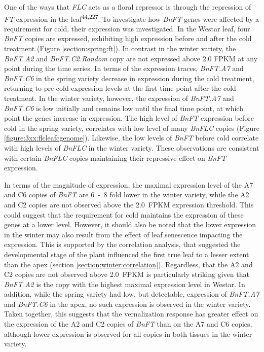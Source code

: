 \documentclass[12pt,]{book}
\begin{document}
One of the ways that \emph{FLC} acts as a floral repressor is through
the repression of \emph{FT} expression in the
leaf\textsuperscript{44,227}. To investigate how \emph{BnFT} genes were
affected by a requirement for cold, their expression was investigated.
In the Westar leaf, four \emph{BnFT} copies are expressed, exhibiting
high expression before and after the cold treatment (Figure
\ref{section:spring:ft}). In contrast in the winter variety, the
\emph{BnFT.A2} and \emph{BnFT.C2.Random} copy are not expressed above
2.0 FPKM at any point during the time series. In terms of the expression
traces, \emph{BnFT.A7} and \emph{BnFT.C6} in the spring variety decrease
in expression during the cold treatment, returning to pre-cold
expression levels at the first time point after the cold treatment. In
the winter variety, however, the expression of \emph{BnFT.A7} and
\emph{BnFT.C6} is low initially and remains low until the final time
point, at which point the genes increase in expression. The high level
of \emph{BnFT} expression before cold in the spring variety, correlates
with low level of many \emph{BnFLC} copies (Figure
\ref{figure:3xx:flcleafcgenome}). Likewise, the low levels of
\emph{BnFT} before cold correlate with high levels of \emph{BnFLC} in
the winter variety. These observations are consistent with certain
\emph{BnFLC} copies maintaining their repressive effect on \emph{BnFT}
expression.

In terms of the magnitude of expression, the maximal expression level of
the A7 and C6 copies of \emph{BnFT} are 6~-~8 fold lower in the winter
variety, while the A2 and C2 copies are not observed above the 2.0~FPKM
expression threshold. This could suggest that the requirement for cold
maintains the expression of these genes at a lower level. However, it
should also be noted that the lower expression in the winter may also
result from the effect of leaf senescence impacting the expression. This
is supported by the correlation analysis, that suggested the
developmental stage of the plant influenced the first true leaf to a
lesser extent than the apex (section \ref{section:winter:correlation}).
Regardless, that the A2 and C2 copies are not observed above 2.0~FPKM is
particularly striking given that \emph{BnFT.A2} is the copy with the
highest maximal expression level in Westar. In addition, while the
spring variety had low, but detectable, expression of \emph{BnFT.A7} and
\emph{BnFT.C6} in the apex, no such expression is observed in the winter
variety. Taken together, this suggests that the vernalization response
has greater effect on the expression of the A2 and C2 copies of
\emph{BnFT} than on the A7 and C6 copies, although lower expression is
observed for all copies in both tissues in the winter variety.
\end{document}
